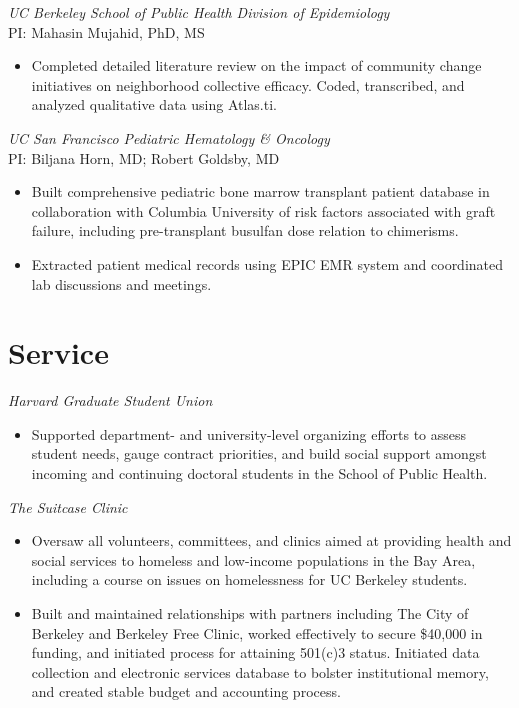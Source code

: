 \documentclass{cv_style}
\begin{document}
\textit{UC Berkeley School of Public Health Division of Epidemiology} \\
PI: Mahasin Mujahid, PhD, MS
\begin{itemize}
    \item Completed detailed literature review on the impact of community change initiatives on neighborhood collective efficacy. Coded, transcribed, and analyzed qualitative data using Atlas.ti.
\end{itemize}

\textit{UC San Francisco Pediatric Hematology \& Oncology} \\
PI: Biljana Horn, MD; Robert Goldsby, MD
\begin{itemize}
    \item Built comprehensive pediatric bone marrow transplant patient database in collaboration with Columbia University of risk factors associated with graft failure, including pre-transplant busulfan dose relation to chimerisms.
    \item \parskip 1pt Extracted patient medical records using EPIC EMR system and coordinated lab discussions and meetings.
\end{itemize}



\section{Service}

\textit{Harvard Graduate Student Union}
\begin{itemize}
    \item Supported department- and university-level organizing efforts to assess student needs, gauge contract priorities, and build social support amongst incoming and continuing doctoral students in the School of Public Health. 
\end{itemize}

\textit{The Suitcase Clinic}
\begin{itemize}
    \item Oversaw all volunteers, committees, and clinics aimed at providing health and social services to homeless and low-income populations in the Bay Area, including a course on issues on homelessness for UC Berkeley  students. 
    \item \parskip 1pt Built and maintained relationships with partners including The City of Berkeley and Berkeley Free Clinic, worked effectively to secure \$40,000 in funding, and initiated process for attaining 501(c)3 status. Initiated data collection and electronic services database to bolster institutional memory, and created stable budget and accounting process.
\end{itemize}
\end{document}
